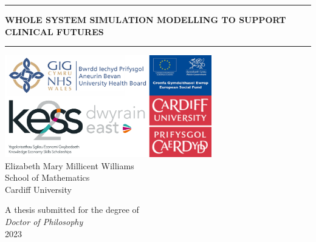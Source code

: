 \documentclass[../thesis.tex]{subfiles}
\begin{document}
\thispagestyle{empty} %
\calccentering{\unitlength}
\centering
\vspace*{0.05\textheight} %

\rule{\textwidth}{0.4pt}%
\vspace{1\baselineskip} 
{\LARGE \textbf{WHOLE SYSTEM SIMULATION MODELLING TO SUPPORT CLINICAL FUTURES}}
\vspace{0.75\baselineskip} %
\rule{\textwidth}{0.4pt}\vspace*{-\baselineskip}\vspace{3.2pt}
\vfill
\includegraphics[width =90mm]{includes/Combined images.png}\\
\vfill
{\Large Elizabeth Mary Millicent Williams}\\
\vspace{0.75\baselineskip} 
{\Large School of Mathematics}\\
\vspace{0.75\baselineskip} 
{\Large Cardiff University}
\vfill

{\Large A thesis submitted for the degree of\\[0.35em] \textit{Doctor of Philosophy}}\\
\vfill
{\Large 2023}      %

\end{document}

